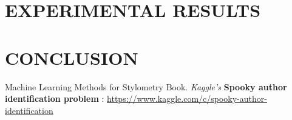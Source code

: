 \documentclass[letterpaper, 10 pt, conference]{ieeeconf}  %
\newcommand{\link}[1]{{\color{blue}\href{#1}{#1}}}
\begin{document}

\section{EXPERIMENTAL RESULTS}



\section{CONCLUSION}



\begin{thebibliography}{99}
 Machine Learning Methods for Stylometry Book.
 \emph{Kaggle's} \textbf{Spooky author identification problem} : \link{https://www.kaggle.com/c/spooky-author-identification}
\end{thebibliography}

\end{document}
